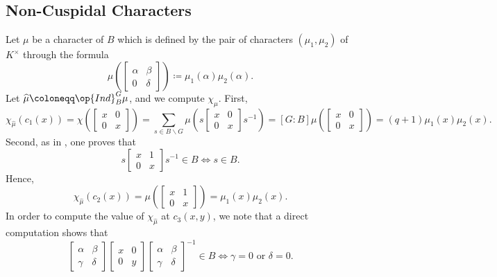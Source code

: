 \documentclass[../main.tex]{subfiles}
\begin{document}
\subsection{Non-Cuspidal Characters}
Let $\mu$ be a character of $B$ which is defined by the pair of characters $(\mu_1,\mu_2)$ of $K^\times$ through the formula
\[\mu\left(\begin{bmatrix}
	\alpha & \beta \\
	0 & \delta
\end{bmatrix}\right)\coloneqq\mu_1(\alpha)\mu_2(\alpha).\]
Let $\widehat\mu\coloneqq\op{Ind}^G_B\mu$, and we compute $\chi_{\widehat\mu}$. First,
\[\chi_{\widehat\mu}(c_1(x)) = \chi\left(\begin{bmatrix}
	x & 0 \\
	0 & x
\end{bmatrix}\right) = \sum_{s\in B\backslash G}\mu\left(s\begin{bmatrix}
	x & 0 \\
	0 & x
\end{bmatrix}s^{-1}\right)=[G:B]\mu\left(\begin{bmatrix}
	x & 0 \\
	0 & x
\end{bmatrix}\right)=(q+1)\mu_1(x)\mu_2(x).\]
Second, as in , one proves that
\[s\begin{bmatrix}
	x & 1 \\
	0 & x
\end{bmatrix}s^{-1}\in B\iff s\in B.\]
Hence,
\[\chi_{\widehat\mu}(c_2(x))=\mu\left(\begin{bmatrix}
	x & 1 \\
	0 & x
\end{bmatrix}\right)=\mu_1(x)\mu_2(x).\]
In order to compute the value of $\chi_{\widehat\mu}$ at $c_3(x,y)$, we note that a direct computation shows that
\begin{equation}
	\begin{bmatrix}
		\alpha & \beta \\
		\gamma & \delta
	\end{bmatrix}\begin{bmatrix}
		x & 0 \\
		0 & y
	\end{bmatrix}\begin{bmatrix}
		\alpha & \beta \\
		\gamma & \delta
	\end{bmatrix}^{-1}\in B\iff\gamma=0\text{ or }\delta=0. \label{eq:c3-in-b}
\end{equation}
\end{document}
